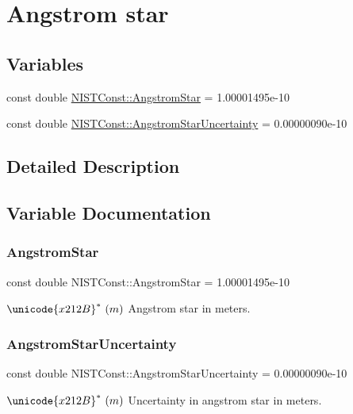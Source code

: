 \hypertarget{group___n_i_s_t_const-_angstrom_star}{}\section{Angstrom star}
\label{group___n_i_s_t_const-_angstrom_star}
\subsection*{Variables}
\begin{DoxyCompactItemize}
\item 
const double \hyperlink{group___n_i_s_t_const-_angstrom_star_ga42db9558ed1ddd9706c14e4d0b0863cc}{N\+I\+S\+T\+Const\+::\+Angstrom\+Star} = 1.\+00001495e-\/10
\item 
const double \hyperlink{group___n_i_s_t_const-_angstrom_star_ga13575debadc16e90aefbe76fdfa771a6}{N\+I\+S\+T\+Const\+::\+Angstrom\+Star\+Uncertainty} = 0.\+00000090e-\/10
\end{DoxyCompactItemize}


\subsection{Detailed Description}


\subsection{Variable Documentation}
\mbox{\label{group___n_i_s_t_const-_angstrom_star_ga42db9558ed1ddd9706c14e4d0b0863cc}} 
\subsubsection{\texorpdfstring{Angstrom\+Star}{AngstromStar}}
{\footnotesize\ttfamily const double N\+I\+S\+T\+Const\+::\+Angstrom\+Star = 1.\+00001495e-\/10}

$\unicode{x212B}^{\ast} \ (m)$ Angstrom star in meters. \mbox{\label{group___n_i_s_t_const-_angstrom_star_ga13575debadc16e90aefbe76fdfa771a6}} 
\subsubsection{\texorpdfstring{Angstrom\+Star\+Uncertainty}{AngstromStarUncertainty}}
{\footnotesize\ttfamily const double N\+I\+S\+T\+Const\+::\+Angstrom\+Star\+Uncertainty = 0.\+00000090e-\/10}

$\unicode{x212B}^{\ast} \ (m)$ Uncertainty in angstrom star in meters. 